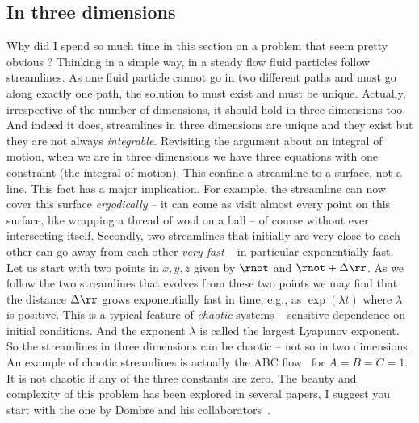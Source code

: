 \subsection{In three dimensions}
Why did I spend so much time in this section on a problem that seem
pretty obvious ? Thinking in a simple way, in a steady flow fluid
particles follow streamlines. As one fluid particle cannot go in two
different paths and must go along exactly one path, the solution to
 must exist and must be unique. Actually,
irrespective of the number of dimensions, it should hold in three
dimensions too. And indeed it does, streamlines in three dimensions
are unique and they exist but they are not always
\textit{integrable}. Revisiting the argument about an integral of
motion, when we are in three dimensions we have three equations with
one constraint (the integral of motion). This confine a streamline to
a surface, not a line. This fact has a major implication. For example,
the streamline can now cover this surface \textit{ergodically} -- it
can come as visit almost every point on this surface, like wrapping a
thread of wool on a ball -- of course without ever intersecting
itself. Secondly, two streamlines that initially are very close to
each other can go away from each other \textit{very fast} -- in
particular exponentially fast. Let us start with two points in $x,y,z$
given by $\rnot$ and $\rnot+\Delta \rr$.
As we follow the two streamlines that evolves from these two points we
may find that the distance $\Delta \rr$ grows exponentially fast in
time, e.g., as $\exp(\lambda t)$ where $\lambda$ is positive. 
This is a typical feature of \textit{chaotic} systems -- sensitive
dependence on initial conditions. And the exponent $\lambda$ is called
the largest Lyapunov exponent. So the streamlines in three dimensions
can be chaotic -- not so in two dimensions. An example of chaotic
streamlines is actually the ABC flow~ for $A=B=C=1$. 
It is not chaotic if any of the three constants are zero. The beauty
and complexity of this problem has been explored in several papers, I
suggest you start with the one by Dombre and his collaborators~\cite{dom+fri+hen+gre+sow86}.   
